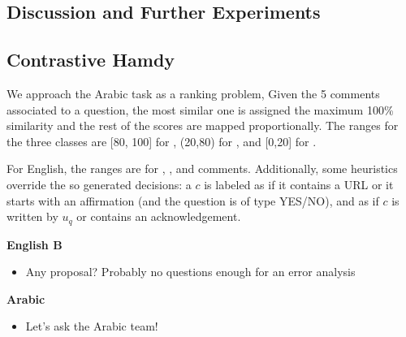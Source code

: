 \subsection{Discussion and Further Experiments} \label{sec:expdiscussion}

\subsection{Contrastive Hamdy}

We approach the Arabic task as a ranking problem, Given the 5 comments 
associated to a question, the most similar one is assigned the maximum 100\% 
similarity and the rest of the scores are mapped proportionally. The ranges 
for the three classes are [80, 100] for \dir, (20,80) for \rel, and [0,20] 
for \irel.

For English, the ranges are  for \good, \pot, and \bad 
comments. Additionally, some heuristics override the so generated decisions: a 
$c$ is labeled as \good if
\Ni it contains a URL or
\Nii it starts with an affirmation (and the question is of type YES/NO), and as 
\bad if $c$ is written by $u_q$ or contains an acknowledgement.

\textbf{English B}
\begin{itemize}
 \item Any proposal? Probably no questions enough for an error analysis
\end{itemize}



\textbf{Arabic}

\begin{itemize}
 \item Let's ask the Arabic team!
\end{itemize}

% 
% 
% 


